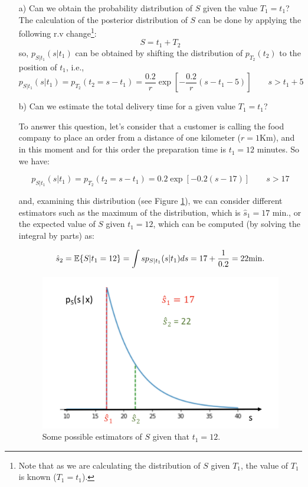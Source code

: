 \begin{solution}
\begin{itemize}
\item[a)] Can we obtain the probability distribution of $S$ given the value $T_1=t_1$?\\
The calculation of the posterior distribution of $S$ can be done by applying the following r.v change\footnote{Note that as we are calculating the distribution of $S$ given $T_1$, the value of $T_1$ is known ($T_1=t_1$).}:
$$S = t_1 + T_2$$
so, $p_{S|t_1}(s|t_1)$ can be obtained by shifting the distribution of $p_{T_2}(t_2)$ to the position of $t_1$, i.e.,
$$p_{S|t_1}(s|t_1)=p_{T_2}(t_2=s-t_1) =
\frac{0.2}{r} \exp{\left[-\frac{0.2}{r} (s-t_1-5)\right]} \quad \quad  s >t_1 +5$$


\item[b)] Can we estimate the total delivery time for a given value $T_1=t_1$? 

To answer this question, let's consider that a customer is calling the food company to place an order from a distance of one kilometer ($r=1$Km), and in this moment and for this order the preparation time is $t_1=12$ minutes. So we have:

$$p_{S|t_1}(s|t_1)=p_{T_2}(t_2=s-t_1) =
0.2 \exp{\left[-0.2 (s-17)\right]} \quad \quad  s >17$$

and, examining this distribution (see Figure \ref{p_S_x2}), we can consider different estimators such as the maximum of the distribution, which is $\hat{s}_1=17$ min., or the expected value of $S$ given $t_1=12$, which can be computed (by solving the integral by parts) as:

$$ \hat{s}_2= \mathbb{E}\{S|t_1=12\} = \int s p_{S|t_1}(s|t_1) ds = 17+\frac{1}{0.2} = 22 {\rm min.}$$

\begin{figure}[!t]
\begin{center}
\includegraphics[scale=.25]{Figures/Fig_MC1_12.png}
\caption{Some possible estimators of $S$ given that $t_1=12$.}
\end{center}
\label{p_S_x2}
\end{figure}


\end{itemize}
\end{solution}
